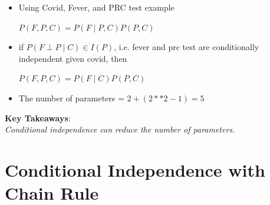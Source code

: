 \documentclass[11pt,a4paper]{report}
\begin{document}
\begin{itemize}
\begin{itemize}
    \item Using Covid, Fever, and PRC test example\\
    \begin{center}
        $P(F,P,C) = P(F \mid P,C)P(P,C)$\\
    \end{center}
    \item if $P(F \perp P \mid C) \in I(P)$, i.e. fever and prc test are conditionally independent given covid, then\\
    \begin{center}
        $P(F,P,C) = P(F \mid C)P(P,C)$
    \end{center}
    \item The number of parameters = $2 + (2**2 - 1) = 5$
\end{itemize}
\end{itemize}

\textbf{\color{blue}Key Takeaways}: \\ \textit{\color{blue}Conditional independence can reduce the number of parameters.}

\section{Conditional Independence with Chain Rule}
\end{document}
